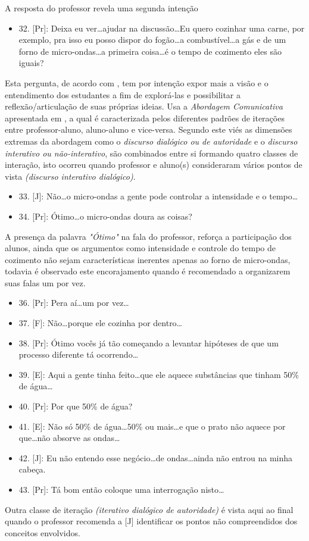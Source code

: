 A resposta do professor revela uma segunda intenção
\begin{itemize}
    \item 32. [Pr]: Deixa eu ver\ldots ajudar na discussão\ldots Eu quero cozinhar uma carne, por exemplo, pra isso eu posso dispor do fogão\ldots a combustível\ldots a gás e de um forno de micro-ondas\ldots a primeira coisa\ldots é o tempo de cozimento eles são iguais?
\end{itemize}
Esta pergunta, de acordo com \cite{MORTIMER:2002}, tem por intenção expor mais a visão e o entendimento dos estudantes a fim de explorá-las e possibilitar a reflexão/articulação de suas próprias ideias. Usa a \emph{Abordagem Comunicativa} apresentada em , a qual é caracterizada pelos diferentes padrões de iterações entre professor-aluno, aluno-aluno e vice-versa. Segundo este viés as dimensões extremas da abordagem como o \emph{discurso dialógico ou de autoridade} e o \emph{discurso interativo ou não-interativo}, são combinados entre si formando quatro classes de interação, isto ocorreu quando professor e aluno(s) consideraram vários pontos de vista \emph{(discurso interativo dialógico)}.
\begin{itemize}
    \item 33. [J]: Não\ldots o micro-ondas a gente pode controlar a intensidade e o tempo\ldots
    \item 34. [Pr]: Ótimo\ldots o micro-ondas doura as coisas?
\end{itemize}   
A presença da palavra \emph{"Ótimo"} na fala do professor, reforça a participação dos alunos, ainda que os argumentos como intensidade e controle do tempo de cozimento não sejam características inerentes apenas ao forno de micro-ondas, todavia é observado este encorajamento quando é recomendado a organizarem suas falas um por vez.
\begin{itemize}
    \item 36. [Pr]: Pera aí\ldots um por vez\ldots
    \item 37. [F]: Não\ldots porque ele cozinha por dentro\ldots
    \item 38. [Pr]: Ótimo vocês já tão começando a levantar hipóteses de que um processo diferente tá ocorrendo\ldots
    \item 39. [E]: Aqui a gente tinha feito\ldots que ele aquece substâncias que tinham 50\% de água\ldots
    \item 40. [Pr]: Por que 50\% de água?
    \item 41. [E]: Não só 50\% de água\ldots 50\% ou mais\ldots e que o prato não aquece por que\ldots não absorve as ondas\ldots
    \item 42. [J]: Eu não entendo esse negócio\ldots de ondas\ldots ainda não entrou na minha cabeça.
    \item 43. [Pr]: Tá bom então coloque uma interrogação nisto\ldots
\end{itemize}
Outra classe de iteração \emph{(iterativo dialógico de autoridade)} é vista aqui ao final quando o professor recomenda a [J] identificar os pontos não compreendidos dos conceitos envolvidos.

